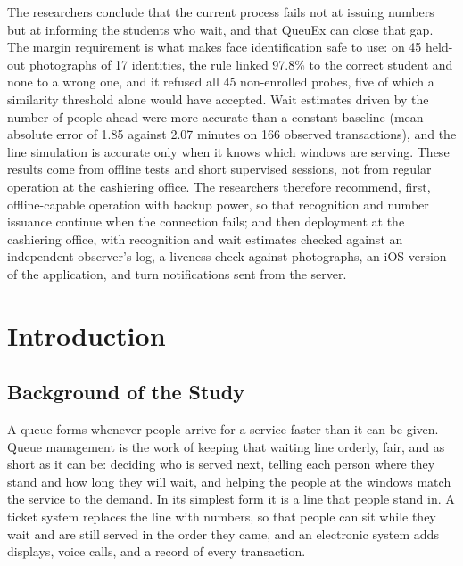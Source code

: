 \documentclass{research}
\newcommand{\sysname}{QueuEx}
\begin{document}
The researchers conclude that the current process fails not at issuing
numbers but at informing the students who wait, and that \sysname{} can
close that gap. The margin requirement is what makes face
identification safe to use: on 45 held-out photographs of 17 identities,
the rule linked 97.8\% to the correct student and none to a wrong one,
and it refused all 45 non-enrolled probes, five of which a similarity
threshold alone would have accepted. Wait estimates driven by the number
of people ahead were more accurate than a constant baseline (mean
absolute error of 1.85 against 2.07 minutes on 166 observed
transactions), and the line simulation is accurate only when it knows
which windows are serving. These results come from offline tests and
short supervised sessions, not from regular operation at the cashiering
office. The researchers therefore recommend, first, offline-capable
operation with backup power, so that recognition and number issuance
continue when the connection fails; and then deployment at the
cashiering office, with recognition and wait estimates checked against
an independent observer's log, a liveness check against photographs, an
iOS version of the application, and turn notifications sent from the
server.

\newpage

\tableofcontents
\newpage
\listoffigures
\newpage
\listoftables
\newpage

\pagestyle{fancy}
\chapter{Introduction}

\section{Background of the Study}
\label{cr:background}

A queue forms whenever people arrive for a service faster than it can
be given. Queue management is the work of keeping that waiting line
orderly, fair, and as short as it can be: deciding who is served next,
telling each person where they stand and how long they will wait, and
helping the people at the windows match the service to the demand. In
its simplest form it is a line that people stand in. A ticket system
replaces the line with numbers, so that people can sit while they wait
and are still served in the order they came, and an electronic system
adds displays, voice calls, and a record of every transaction.
\end{document}
